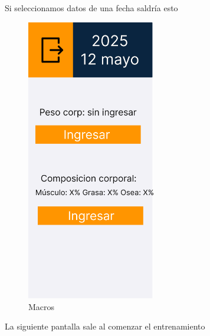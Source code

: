 \newpage

Si seleccionamos datos de una fecha saldría esto
\begin{figure}[H]
   \centering
    \includegraphics[width=0.5\textwidth]{fotos/Frame 29.png}
    \caption{Macros}
    \label{fig:Frame_29}
\end{figure}

La siguiente pantalla sale al comenzar el entrenamiento

\newpage

